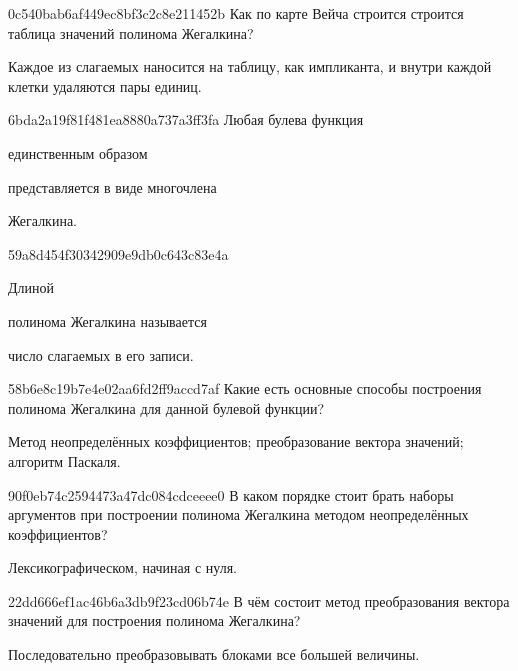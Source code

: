 \begin{note}{0c540bab6af449ec8bf3c2c8e211452b}
    Как по карте Вейча строится строится таблица значений полинома Жегалкина?

    \begin{cloze}{1}
        Каждое из слагаемых наносится на таблицу, как импликанта, и внутри каждой клетки удаляются пары единиц.
    \end{cloze}
\end{note}

\begin{note}{6bda2a19f81f481ea8880a737a3ff3fa}
    Любая булева функция \begin{icloze}{2}единственным образом\end{icloze} представляется в виде многочлена \begin{icloze}{1}Жегалкина.\end{icloze}
\end{note}

\begin{note}{59a8d454f30342909e9db0c643c83e4a}
    \begin{icloze}{2}Длиной\end{icloze} полинома Жегалкина называется \begin{icloze}{1}число слагаемых в его записи.\end{icloze}
\end{note}

\begin{note}{58b6e8c19b7e4e02aa6fd2ff9accd7af}
    Какие есть основные способы построения полинома Жегалкина для данной булевой функции?

    \begin{cloze}{1}
        Метод неопределённых коэффициентов; преобразование вектора значений; алгоритм Паскаля.
    \end{cloze}
\end{note}

\begin{note}{90f0eb74c2594473a47dc084cdceeee0}
    В каком порядке стоит брать наборы аргументов при построении полинома Жегалкина методом неопределённых коэффициентов?

    \begin{cloze}{1}
        Лексикографическом, начиная с нуля.
    \end{cloze}
\end{note}

\begin{note}{22dd666ef1ac46b6a3db9f23cd06b74e}
    В чём состоит метод преобразования вектора значений для построения полинома Жегалкина?

    \begin{cloze}{1}
        Последовательно преобразовывать блоками все большей величины.
    \end{cloze}
\end{note}

